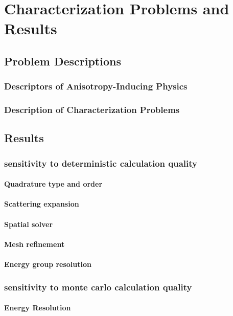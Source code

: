 \chapter{Characterization Problems and Results}

\section{Problem Descriptions}
\subsection{Descriptors of Anisotropy-Inducing Physics}
\subsection{Description of Characterization Problems}
\section{Results}
\subsection{sensitivity to deterministic calculation quality}
\subsubsection{Quadrature type and order}
\subsubsection{Scattering expansion}
\subsubsection{Spatial solver}
\subsubsection{Mesh refinement}
\subsubsection{Energy group resolution}
\subsection{sensitivity to monte carlo calculation quality}
\subsubsection{Energy Resolution}
